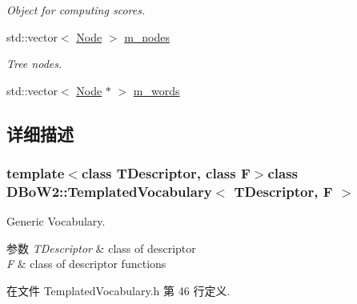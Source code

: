 \begin{DoxyCompactItemize}
\begin{DoxyCompactList}\small\item\em Object for computing scores. \end{DoxyCompactList}\item 
\hypertarget{classDBoW2_1_1TemplatedVocabulary_a82be6d310eae6f4f57a72d340489320b}{std\-::vector$<$ \hyperlink{structDBoW2_1_1TemplatedVocabulary_1_1Node}{Node} $>$ \hyperlink{classDBoW2_1_1TemplatedVocabulary_a82be6d310eae6f4f57a72d340489320b}{m\-\_\-nodes}}\label{classDBoW2_1_1TemplatedVocabulary_a82be6d310eae6f4f57a72d340489320b}

\begin{DoxyCompactList}\small\item\em Tree nodes. \end{DoxyCompactList}\item 
std\-::vector$<$ \hyperlink{structDBoW2_1_1TemplatedVocabulary_1_1Node}{Node} $\ast$ $>$ \hyperlink{classDBoW2_1_1TemplatedVocabulary_a1665546b54f954d2d54d59a6982df3ca}{m\-\_\-words}
\end{DoxyCompactItemize}


\subsection{详细描述}
\subsubsection*{template$<$class T\-Descriptor, class F$>$class D\-Bo\-W2\-::\-Templated\-Vocabulary$<$ T\-Descriptor, F $>$}

Generic Vocabulary. 


\begin{DoxyParams}{参数}
{\em T\-Descriptor} & class of descriptor \\
\hline
{\em F} & class of descriptor functions \\
\hline
\end{DoxyParams}


在文件 Templated\-Vocabulary.\-h 第 46 行定义.




